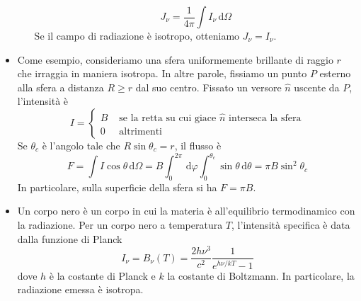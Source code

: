 \documentclass[a4paper,11pt]{article}
\renewcommand{\d}{\mathrm{d}} %
\renewcommand{\d}{\,\mathrm{d}}
\theoremstyle{theorem}
\theoremstyle{definition}
\begin{document}
\begin{itemize}
\begin{itemize}
			\[J_\nu=\frac{1}{4\pi}\int I_\nu\d\Omega\]
			Se il campo di radiazione è isotropo, otteniamo $J_\nu=I_\nu$.
		\end{itemize}
		\item Come esempio, consideriamo una sfera uniformemente brillante di raggio $r$ che irraggia in maniera isotropa. In altre parole, fissiamo un punto $P$ esterno alla sfera a distanza $R\geq r$ dal suo centro. Fissato un versore $\hat{n}$ uscente da $P$, l'intensità è
		\[I=\begin{cases}
		B&\textrm{ se la retta su cui giace }\hat{n}\textrm{ interseca la sfera}\\
		0&\textrm{ altrimenti}
		\end{cases}\]
		Se $\theta_c$ è l'angolo tale che $R\sin\theta_c=r$, il flusso è
		\[F=\int I\cos\theta\d\Omega=B\int_{0}^{2\pi}\d\varphi\int_{0}^{\theta_c}\sin\theta\d\theta=\pi B\sin^2\theta_c\]
		In particolare, sulla superficie della sfera si ha $F=\pi B$.
		\newpage
		\item Un corpo nero è un corpo in cui la materia è all'equilibrio termodinamico con la radiazione. Per un corpo nero a temperatura $T$, l'intensità specifica è data dalla funzione di Planck
		\[I_\nu=B_\nu(T)=\frac{2h\nu^3}{c^2}\frac{1}{e^{h\nu/kT}-1}\]
		dove $h$ è la costante di Planck e $k$ la costante di Boltzmann. In particolare, la radiazione emessa è isotropa.
		

\end{itemize}
\end{document}
